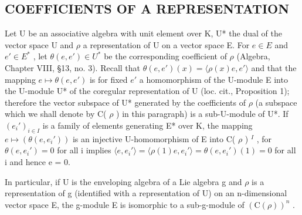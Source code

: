\subsection{COEFFICIENTS OF A REPRESENTATION}

Let U be an associative algebra with unit element over K, U* the dual of the vector space U and \(\rho\) a representation of U on a vector space E. For \(e \in E\) and \(e' \in E^*\) , let \(\theta(e, e') \in U^*\) be the corresponding coefficient of \(\rho\) (Algebra, Chapter VIII, §13, no. 3). Recall that \(\theta(e, e')(x) = \langle \rho(x)e, e' \rangle\) and that the mapping \(e \mapsto \theta(e, e')\) is for fixed \(e'\) a homomorphism of the U-module E into the U-module U* of the coregular representation of U (loc. cit., Proposition 1); therefore the vector subspace of U* generated by the coefficients of \(\rho\) (a subspace which we shall denote by C( \(\rho\) ) in this paragraph) is a sub-U-module of U*. If \((e_i')_{i \in I}\) is a family of elements generating E* over K, the mapping \(e \mapsto (\theta(e, e_i'))\) is an injective U-homomorphism of E into C( \(\rho\) ) \(^{I}\) , for \(\theta(e, e_i') = 0\) for all i implies \(\langle e, e_i' \rangle = \langle \rho(1)e, e_i' \rangle = \theta(e, e_i')(1) = 0\) for all i and hence e = 0.

In particular, if U is the enveloping algebra of a Lie algebra g and \(\rho\) is a representation of g (identified with a representation of U) on an n-dimensional vector space E, the g-module E is isomorphic to a sub-g-module of \((\mathrm{C}(\rho))^{n}\) .

